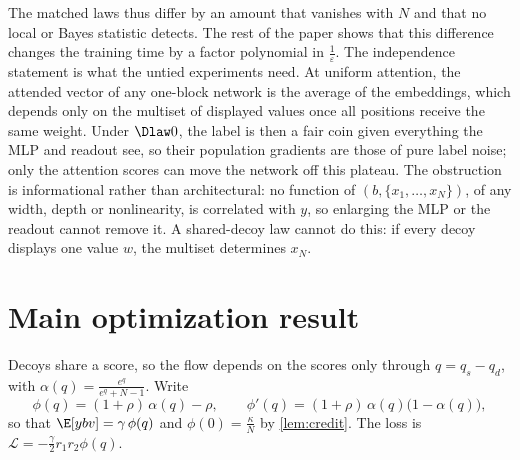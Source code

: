 The matched laws thus differ by an amount that vanishes with $N$ and that no local or Bayes statistic detects. The rest of the paper
shows that this difference changes the training time by a factor polynomial in $\tfrac{1}{\varepsilon}$.
The independence statement is what the untied experiments need. At uniform attention, the attended vector of any one-block network is
the average of the embeddings, which depends only on the multiset of displayed values once all positions receive the same weight.
Under $\Dlaw0$, the label is then a fair coin given everything the MLP and readout see, so their population gradients are those of
pure label noise; only the attention scores can move the network off this plateau.
The obstruction is informational rather than architectural: no function of $(b,\{x_1,\ldots,x_N\})$, of any width, depth or nonlinearity,
is correlated with $y$, so enlarging the MLP or the readout cannot remove it.
A shared-decoy law cannot do this: if every decoy displays one value $w$, the multiset determines $x_N$.

\section{Main optimization result}
\label{sec:dynamics}

Decoys share a score, so the flow depends on the scores only through $q=q_s-q_d$, with
$\alpha(q)=\tfrac{e^q}{e^q+N-1}$. Write
\[
 \phi(q)=(1+\rho)\,\alpha(q)-\rho,\qquad \phi'(q)=(1+\rho)\,\alpha(q)\bigl(1-\alpha(q)\bigr),
\]
so that $\E[y b v]=\gamma\,\phi(q)$ and $\phi(0)=\tfrac{\kappa}{N}$ by \cref{lem:credit}. The loss is $\mathcal L=-\tfrac{\gamma}{2}r_1r_2\phi(q)$.

